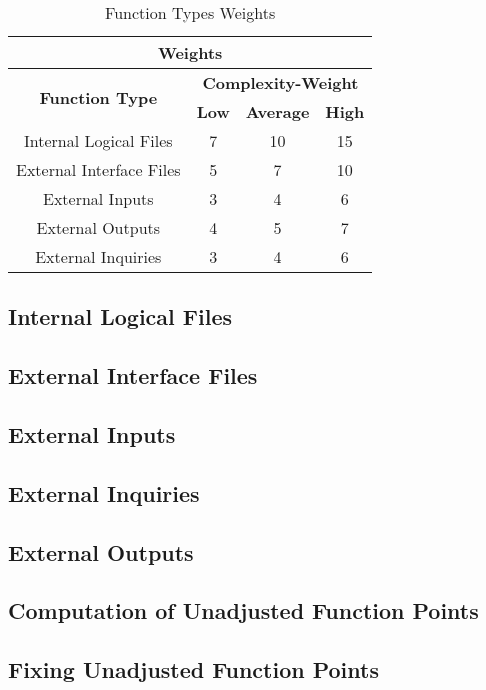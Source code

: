 \documentclass[../../../../projectPlan.tex]{subfiles}
\begin{document}
		\begin{table}[H]
		\centering
		\label{my-label}
		\begin{tabular}{cccc}
			\hline
			\multicolumn{4}{c}{\textbf{Weights}}                                                                           \\ \hline
			\multicolumn{1}{c|}{\multirow{2}{*}{\textbf{Function Type}}} & \multicolumn{3}{c|}{\textbf{Complexity-Weight}} \\
			\multicolumn{1}{c|}{}                                        & \textbf{Low} & \textbf{Average} & \textbf{High} \\ \hline
			\multicolumn{1}{c|}{Internal Logical Files}                  & 7            & 10               & 15            \\ \hline
			\multicolumn{1}{c|}{External Interface Files}                & 5            & 7                & 10            \\ \hline
			\multicolumn{1}{c|}{External Inputs}                         & 3            & 4                & 6             \\ \hline
			\multicolumn{1}{c|}{External Outputs}                        & 4            & 5                & 7             \\ \hline
			\multicolumn{1}{c|}{External Inquiries}                      & 3            & 4                & 6             \\ \hline
		\end{tabular}
		\caption{Function Types Weights}
		\end{table}

		\subsection{Internal Logical Files}



		\subsection{External Interface Files}

		\subsection{External Inputs}

		\subsection{External Inquiries}

		\subsection{External Outputs}

		\subsection{Computation of Unadjusted Function Points}

		\subsection{Fixing Unadjusted Function Points}
\end{document}
